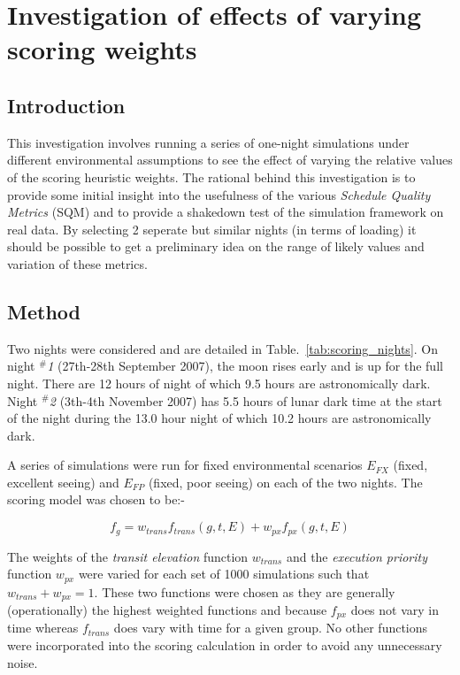 \section{Investigation of effects of varying scoring weights}
\label{sect:exp_scoring}
\subsection{Introduction}

This investigation involves running a series of one-night simulations under different environmental assumptions to see the effect of varying the relative values of the scoring heuristic weights. The rational behind this investigation is to provide some initial insight into the usefulness of the various \emph{Schedule Quality Metrics} (SQM) and to provide a shakedown test of the simulation framework on real data. By selecting 2 seperate but similar nights (in terms of loading) it should be possible to get a preliminary idea on the range of likely values and variation of these metrics.


\subsection{Method}
Two nights were considered and are detailed in Table.~\ref{tab:scoring_nights}. On night \emph{$^\#$1} (27th-28th September 2007), the moon rises early and is up for the full night. There are  12 hours of night of which 9.5 hours are astronomically dark. Night \emph{$^\#$2} (3th-4th November 2007) has 5.5 hours of lunar dark time at the start of the night during the 13.0 hour night of which 10.2 hours are astronomically dark.

 A series of simulations were run for fixed environmental scenarios $E_{FX}$ (fixed, excellent seeing) and $E_{FP}$ (fixed, poor seeing) on each of the two nights. The scoring model was chosen to be:-

\begin{equation}
\label{eq:two_score}
  f_g = w_{trans} f_{trans}(g,t,E) + w_{px} f_{px}(g,t,E)
\end{equation}

The weights of the \emph{transit elevation} function $w_{trans}$ and the \emph{execution priority} function $w_{px}$ were varied for each set of 1000 simulations such that $w_{trans} + w_{px} = 1$. These two functions were chosen as they are generally (operationally) the highest weighted functions and because $f_{px}$ does not vary in time whereas $f_{trans}$ does vary with time for a given group. No other functions were incorporated into the scoring calculation in order to avoid any unnecessary noise.

